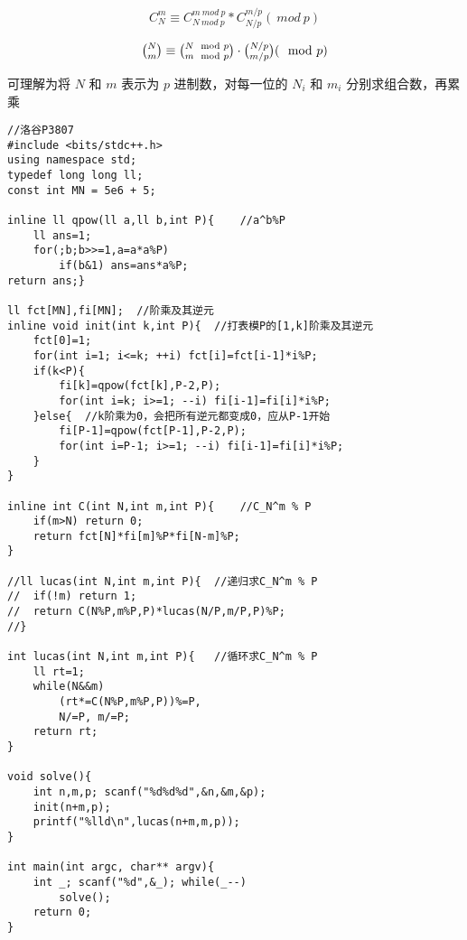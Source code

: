 
$$C_N^m \equiv C_{N\ mod\ p}^{m\ mod\ p} * C_{N/p}^{m/p}(\ mod\ p)$$

$$\tbinom N m \equiv \tbinom{N\mod p}{m\mod p} \cdot \tbinom{N/p}{m/p}(\mod p)$$

可理解为将 $N$ 和 $m$ 表示为 $p$ 进制数，对每一位的 $N_i$ 和 $m_i$ 分别求组合数，再累乘

\begin{lstlisting}
//洛谷P3807 
#include <bits/stdc++.h>
using namespace std;
typedef long long ll;
const int MN = 5e6 + 5;

inline ll qpow(ll a,ll b,int P){	//a^b%P 
	ll ans=1;
	for(;b;b>>=1,a=a*a%P)
		if(b&1) ans=ans*a%P;
return ans;}

ll fct[MN],fi[MN];	//阶乘及其逆元
inline void init(int k,int P){	//打表模P的[1,k]阶乘及其逆元
	fct[0]=1;
	for(int i=1; i<=k; ++i) fct[i]=fct[i-1]*i%P;
	if(k<P){
		fi[k]=qpow(fct[k],P-2,P);
		for(int i=k; i>=1; --i) fi[i-1]=fi[i]*i%P;
	}else{	//k阶乘为0，会把所有逆元都变成0，应从P-1开始
		fi[P-1]=qpow(fct[P-1],P-2,P);
		for(int i=P-1; i>=1; --i) fi[i-1]=fi[i]*i%P;
	}
}

inline int C(int N,int m,int P){	//C_N^m % P
	if(m>N) return 0;
	return fct[N]*fi[m]%P*fi[N-m]%P;
}

//ll lucas(int N,int m,int P){	//递归求C_N^m % P
//	if(!m) return 1;
//	return C(N%P,m%P,P)*lucas(N/P,m/P,P)%P;
//}

int lucas(int N,int m,int P){	//循环求C_N^m % P
	ll rt=1;
	while(N&&m)
		(rt*=C(N%P,m%P,P))%=P,
		N/=P, m/=P;
	return rt;
}

void solve(){
	int n,m,p; scanf("%d%d%d",&n,&m,&p);
	init(n+m,p);
	printf("%lld\n",lucas(n+m,m,p));
}

int main(int argc, char** argv){ 
	int _; scanf("%d",&_); while(_--)
		solve();
	return 0;
}
\end{lstlisting}